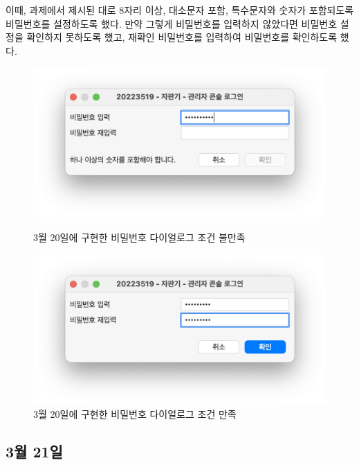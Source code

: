 \documentclass{oblivoir}
\begin{document}
    이때, 과제에서 제시된 대로 8자리 이상, 대소문자 포함, 특수문자와 숫자가 포함되도록
    비밀번호를 설정하도록 했다.
    만약 그렇게 비밀번호를 입력하지 않았다면 비밀번호 설정을 확인하지 못하도록 했고,
    재확인 비밀번호를 입력하여 비밀번호를 확인하도록 했다.
    \begin{figure}[h]
        \centering
        \begin{minipage}{.5\textwidth}
            \includegraphics[width=\textwidth]{0320-password-dialog-1.png}
            \caption{3월 20일에 구현한 비밀번호 다이얼로그 조건 불만족}
            \label{fig:0320-password-dialog-1}
        \end{minipage}%
        \begin{minipage}{.5\textwidth}
            \includegraphics[width=\textwidth]{0320-password-dialog-2.png}
            \caption{3월 20일에 구현한 비밀번호 다이얼로그 조건 만족}
            \label{fig:0320-password-dialog-2}
        \end{minipage}
    \end{figure}

    \subsection{3월 21일}
\end{document}
